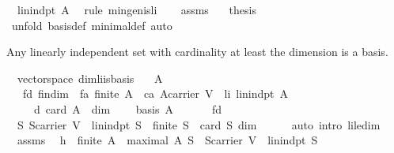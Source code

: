 \begin{isabellebody}
\ {}{\isacharcolon}\ {\isachardoublequoteopen}lin{\isacharunderscore}indpt\ A{\isachardoublequoteclose}\ \isamarkupfalse%
\ {\isacharparenleft}rule\ min{\isacharunderscore}gen{\isacharunderscore}is{\isacharunderscore}li{\isacharparenright}\isanewline
\ \ \isamarkupfalse%
\ assms\ {}\ \isamarkupfalse%
\ {\isacharquery}thesis\ \isamarkupfalse%
\ {\isacharparenleft}unfold\ basis{\isacharunderscore}def\ minimal{\isacharunderscore}def{\isacharcomma}\ auto{\isacharparenright}\isanewline
{}\isamarkupfalse%
%
\endisatagproof
{\isafoldproof}%
%
\isadelimproof
%
\endisadelimproof
%
\begin{isamarkuptext}%
Any linearly independent set with cardinality at least the dimension is a basis.%
\end{isamarkuptext}%
\isamarkuptrue%
\isamarkupfalse%
\ {\isacharparenleft}\ vectorspace{\isacharparenright}\ dim{\isacharunderscore}li{\isacharunderscore}is{\isacharunderscore}basis{\isacharcolon}\isanewline
\ \ \ A\isanewline
\ \ \ fd{\isacharcolon}\ {\isachardoublequoteopen}fin{\isacharunderscore}dim{\isachardoublequoteclose}\ \ fa{\isacharcolon}\ {\isachardoublequoteopen}finite\ A{\isachardoublequoteclose}\ \ ca{\isacharcolon}\ {\isachardoublequoteopen}A{\isasymsubseteq}carrier\ V{\isachardoublequoteclose}\ \ li{\isacharcolon}\ {\isachardoublequoteopen}lin{\isacharunderscore}indpt\ A{\isachardoublequoteclose}\ \isanewline
\ \ \ \ \ d{\isacharcolon}\ {\isachardoublequoteopen}card\ A\ {\isasymge}\ dim{\isachardoublequoteclose}\ \isanewline
\ \ \ {\isachardoublequoteopen}basis\ A{\isachardoublequoteclose}\isanewline
%
\isadelimproof
%
\endisadelimproof
%
\isatagproof
{}\isamarkupfalse%
\ {\isacharminus}\ \isanewline
\ \ \isamarkupfalse%
\ fd\ \isamarkupfalse%
\ {}{\isacharcolon}\ {\isachardoublequoteopen}{\isasymAnd}S{\isachardot}\ S{\isasymsubseteq}carrier\ V\ {\isasymand}\ lin{\isacharunderscore}indpt\ S\ {\isasymLongrightarrow}\ finite\ S\ {\isasymand}\ card\ S\ {\isasymle}dim{\isachardoublequoteclose}\isanewline
\ \ \ \ \isamarkupfalse%
\ {\isacharparenleft}auto\ intro{\isacharcolon}\ li{\isacharunderscore}le{\isacharunderscore}dim{\isacharparenright}\isanewline
\isanewline
\ \ \isamarkupfalse%
\ {}\ assms\ \isamarkupfalse%
\ h{}{\isacharcolon}\ \ {\isachardoublequoteopen}finite\ A\ {\isasymand}\ maximal\ A\ {\isacharparenleft}{\isasymlambda}S{\isachardot}\ \ S{\isasymsubseteq}carrier\ V\ {\isasymand}\ lin{\isacharunderscore}indpt\ S{\isacharparenright}{\isachardoublequoteclose}\isanewline

\end{isabellebody}
